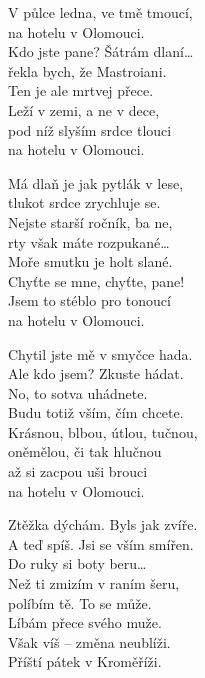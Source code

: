 
\ve{}
V půlce ledna, ve tmě tmoucí,\\
na hotelu v Olomouci.\\
Kdo jste pane? Šátrám dlaní\ldots{}\\
řekla bych, že Mastroiani.\\
Ten je ale mrtvej přece.\\
Leží v zemi, a ne v dece,\\
pod níž slyším srdce tlouci\\
na hotelu v Olomouci.

\ve{}
Má dlaň je jak pytlák v lese,\\
tlukot srdce zrychluje se.\\
Nejste starší ročník, ba ne,\\
rty však máte rozpukané\ldots{}\\
Moře smutku je holt slané.\\
Chyťte se mne, chyťte, pane!\\
Jsem to stéblo pro tonoucí\\
na hotelu v Olomouci.

\ve{}
Chytil jste mě v smyčce hada.\\
Ale kdo jsem? Zkuste hádat.\\
No, to sotva uhádnete.\\
Budu totiž vším, čím chcete.\\
Krásnou, blbou, útlou, tučnou,\\
oněmělou, či tak hlučnou\\
až si zacpou uši brouci\\
na hotelu v Olomouci.

\ve{}
Ztěžka dýchám. Byls jak zvíře.\\
A teď spíš. Jsi se vším smířen.\\
Do ruky si boty beru\ldots{}\\
Než ti zmizím v raním šeru,\\
políbím tě. To se může.\\
Líbám přece svého muže.\\
Však víš -- změna neublíži.\\
Příští pátek v Kroměříži.

\esong{}